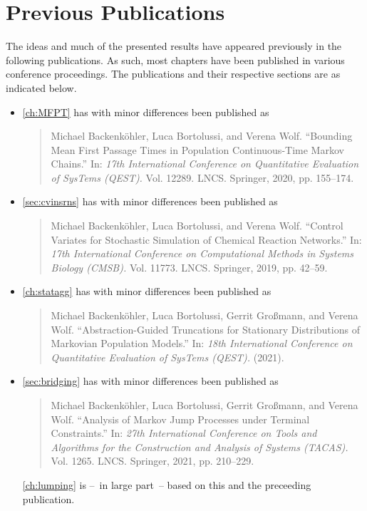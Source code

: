 \section{Previous Publications}%
The ideas and much of the presented results have appeared previously in the following publications.
As such, most chapters have been published in various conference proceedings.
The publications and their respective sections are as indicated below.

\begin{itemize}

\item \autoref{ch:MFPT} has with minor differences been published as
\begin{quote}
	Michael Backenköhler, Luca Bortolussi, and Verena
Wolf. ``Bounding Mean First Passage Times in
	Population Con\-tin\-uo\-us-Time Markov Chains.'' In: \emph{17th
International Conference on Quantitative Evaluation of
	SysTems (QEST).} Vol. 12289. LNCS. Springer, 2020,
pp. 155--174.
\end{quote}

\item \autoref{sec:cvinsrns} has with minor differences been published as
\begin{quote}
	Michael Backenköhler, Luca Bortolussi, and Verena
Wolf. ``Control Variates for Stochastic Simulation of
	Chemical Reaction Networks.'' In: \emph{17th International
	Conference on Computational Methods in Systems Biology (CMSB).} Vol. 11773. LNCS. Springer, 2019,
pp. 42--59.
\end{quote}

\item \autoref{ch:statagg} has with minor differences been published as
\begin{quote}
	Michael Backenköhler, Luca Bortolussi, Gerrit Großmann, and Verena Wolf. ``Abstraction-Guided Truncations
for Stationary Distributions of Markovian
	Population Models.'' In: \emph{18th
International Conference on Quantitative Evaluation of
	SysTems (QEST).} (2021).
\end{quote}

	\item \autoref{sec:bridging} has with minor differences been published as

\begin{quote}
	Michael Backenköhler, Luca Bortolussi, Gerrit Großmann, and Verena Wolf.
	``Analysis of Markov Jump Processes under Terminal Constraints.''
	In: \emph{27th International Conference on Tools and Algorithms for
	the Construction and Analysis of Systems (TACAS).}  Vol. 1265. LNCS.
	Springer, 2021, pp. 210--229.
\end{quote}
		\autoref{ch:lumping} is --~in large part~-- based on this and the preceeding publication.
\end{itemize}

